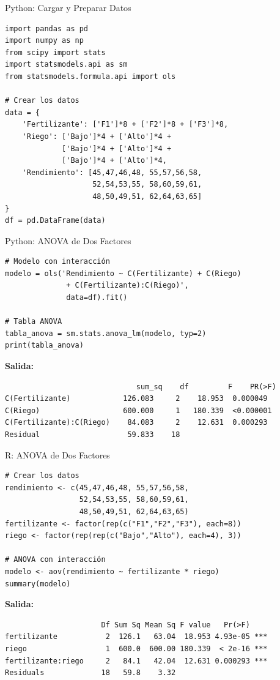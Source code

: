 \documentclass[aspectratio=169]{beamer}
\begin{document}
\begin{frame}[fragile]{Python: Cargar y Preparar Datos}
\small
\begin{verbatim}
import pandas as pd
import numpy as np
from scipy import stats
import statsmodels.api as sm
from statsmodels.formula.api import ols

# Crear los datos
data = {
    'Fertilizante': ['F1']*8 + ['F2']*8 + ['F3']*8,
    'Riego': ['Bajo']*4 + ['Alto']*4 +
             ['Bajo']*4 + ['Alto']*4 +
             ['Bajo']*4 + ['Alto']*4,
    'Rendimiento': [45,47,46,48, 55,57,56,58,
                    52,54,53,55, 58,60,59,61,
                    48,50,49,51, 62,64,63,65]
}
df = pd.DataFrame(data)
\end{verbatim}
\end{frame}

\begin{frame}[fragile]{Python: ANOVA de Dos Factores}
\small
\begin{verbatim}
# Modelo con interacción
modelo = ols('Rendimiento ~ C(Fertilizante) + C(Riego) 
              + C(Fertilizante):C(Riego)', 
              data=df).fit()

# Tabla ANOVA
tabla_anova = sm.stats.anova_lm(modelo, typ=2)
print(tabla_anova)
\end{verbatim}

\vspace{0.2cm}

\textbf{Salida:}
\begin{verbatim}
                              sum_sq    df         F    PR(>F)
C(Fertilizante)            126.083     2    18.953  0.000049
C(Riego)                   600.000     1   180.339  <0.000001
C(Fertilizante):C(Riego)    84.083     2    12.631  0.000293
Residual                    59.833    18
\end{verbatim}
\end{frame}

\begin{frame}[fragile]{R: ANOVA de Dos Factores}
\small
\begin{verbatim}
# Crear los datos
rendimiento <- c(45,47,46,48, 55,57,56,58,
                 52,54,53,55, 58,60,59,61,
                 48,50,49,51, 62,64,63,65)
fertilizante <- factor(rep(c("F1","F2","F3"), each=8))
riego <- factor(rep(rep(c("Bajo","Alto"), each=4), 3))

# ANOVA con interacción
modelo <- aov(rendimiento ~ fertilizante * riego)
summary(modelo)
\end{verbatim}

\vspace{0.2cm}

\textbf{Salida:}
\begin{verbatim}
                      Df Sum Sq Mean Sq F value   Pr(>F)    
fertilizante           2  126.1   63.04  18.953 4.93e-05 ***
riego                  1  600.0  600.00 180.339  < 2e-16 ***
fertilizante:riego     2   84.1   42.04  12.631 0.000293 ***
Residuals             18   59.8    3.32                     
\end{verbatim}
\end{frame}
\end{document}

